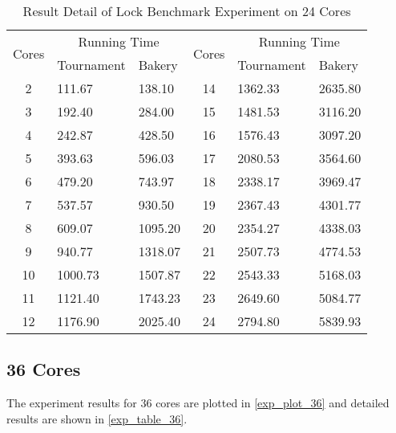 \documentclass{article}
\begin{document}
\begin{table}[H]
    \caption{Result Detail of Lock Benchmark Experiment on 24 Cores}
    \label{exp_table_24}
    \centering
    \begin{tabular}{c|ll|c|ll}
        \toprule
        \multirow{2}{*}{Cores} & \multicolumn{2}{|c|}{Running Time} &
        \multirow{2}{*}{Cores} & \multicolumn{2}{|c}{Running Time} \\
                               & Tournament & Bakery & & Tournament & Bakery \\\midrule
        2 & 111.67 & 138.10 & 14 & 1362.33 & 2635.80 \\
        3 & 192.40 & 284.00 & 15 & 1481.53 & 3116.20 \\
        4 & 242.87 & 428.50 & 16 & 1576.43 & 3097.20 \\
        5 & 393.63 & 596.03 & 17 & 2080.53 & 3564.60 \\
        6 & 479.20 & 743.97 & 18 & 2338.17 & 3969.47 \\
        7 & 537.57 & 930.50 & 19 & 2367.43 & 4301.77 \\
        8 & 609.07 & 1095.20 & 20 & 2354.27 & 4338.03 \\
        9 & 940.77 & 1318.07 & 21 & 2507.73 & 4774.53 \\
        10 & 1000.73 & 1507.87 & 22 & 2543.33 & 5168.03 \\
        11 & 1121.40 & 1743.23 & 23 & 2649.60 & 5084.77 \\
        12 & 1176.90 & 2025.40 & 24 & 2794.80 & 5839.93 \\
        \bottomrule
    \end{tabular}
\end{table}


\subsection*{36 Cores}
The experiment results for 36 cores are plotted in \cref{exp_plot_36} and detailed
results are shown in \cref{exp_table_36}.
\end{document}
